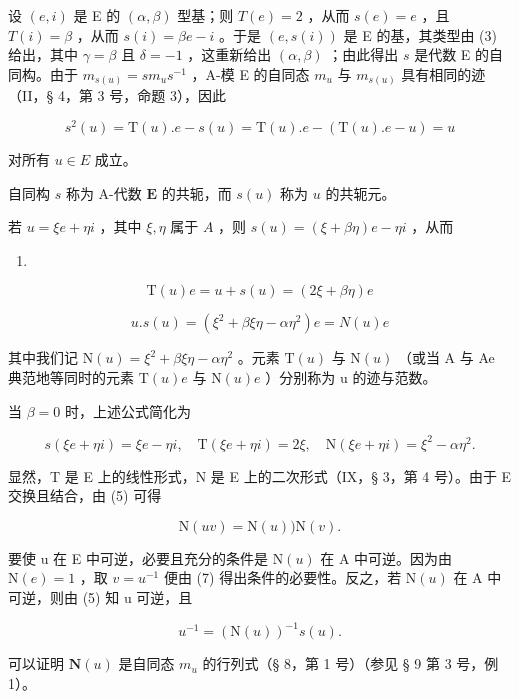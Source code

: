设 \((e, i)\) 是 E 的 \((\alpha, \beta)\) 型基；则 \(T(e) = 2\) ，从而 \(s(e) = e\) ，且 \(T(i) = \beta\) ，从而 \(s(i) = \beta e - i\) 。于是 \((e, s(i))\) 是 E 的基，其类型由 (3) 给出，其中 \(\gamma = \beta\) 且 \(\delta = -1\) ，这重新给出 \((\alpha, \beta)\) ；由此得出 \(s\) 是代数 E 的自同构。由于 \(m_{s(u)} = sm_u s^{-1}\) ，A-模 E 的自同态 \(m_u\) 与 \(m_{s(u)}\) 具有相同的迹（II，§ 4，第 3 号，命题 3），因此

\[
s ^ {2} (u) = \mathrm{T} (u). e - s (u) = \mathrm{T} (u). e - (\mathrm{T} (u). e - u) = u
\]

对所有 \(u \in E\) 成立。

自同构 \(s\) 称为 A-代数 \(\mathbf{E}\) 的共轭，而 \(s(u)\) 称为 \(u\) 的共轭元。

若 \(u = \xi e + \eta i\) ，其中 \(\xi, \eta\) 属于 \(A\) ，则 \(s(u) = (\xi + \beta \eta)e - \eta i\) ，从而

\begin{enumerate}
\def\labelenumi{(\arabic{enumi})}
\setcounter{enumi}{3}
\tightlist
\item
\end{enumerate}

\[
\mathrm{T} (u) e = u + s (u) = (2 \xi + \beta \eta) e\tag{5}
\]

\[
u. s (u) = (\xi^ {2} + \beta \xi \eta - \alpha \eta^ {2}) e = N (u) e
\]

其中我们记 \(\mathrm{N}(u)=\xi^{2}+\beta\xi\eta-\alpha\eta^{2}\) 。元素 \(\mathrm{T}(u)\) 与 \(\mathrm{N}(u)\) （或当 A 与 Ae 典范地等同时的元素 \(\mathrm{T}(u)e\) 与 \(\mathrm{N}(u)e\) ）分别称为 u 的迹与范数。

当 \(\beta = 0\) 时，上述公式简化为

\[
s (\xi e + \eta i) = \xi e - \eta i, \quad \mathrm{T} (\xi e + \eta i) = 2 \xi , \quad \mathrm{N} (\xi e + \eta i) = \xi^ {2} - \alpha \eta^ {2}. \tag {6}
\]

显然，T 是 E 上的线性形式，N 是 E 上的二次形式（IX，§ 3，第 4 号）。由于 E 交换且结合，由 (5) 可得

\[
\mathrm{N} (u v) = \mathrm{N} (u)) \mathrm{N} (v).\tag{7}
\]

要使 u 在 E 中可逆，必要且充分的条件是 \(\mathrm{N}(u)\) 在 A 中可逆。因为由 \(\mathrm{N}(e)=1\) ，取 \(v=u^{-1}\) 便由 (7) 得出条件的必要性。反之，若 \(\mathrm{N}(u)\) 在 A 中可逆，则由 (5) 知 u 可逆，且

\[
u ^ {- 1} = (\mathrm{N} (u)) ^ {- 1} s (u).\tag{8}
\]

可以证明 \(\mathbf{N}(u)\) 是自同态 \(m_u\) 的行列式（§ 8，第 1 号）（参见 § 9 第 3 号，例 1）。

